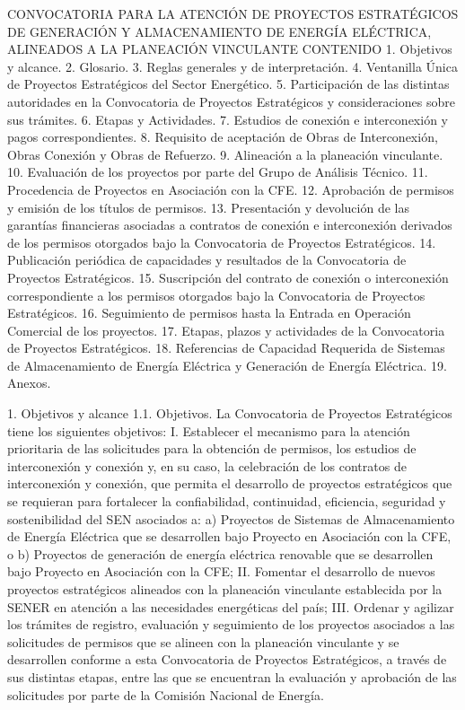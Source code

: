 CONVOCATORIA PARA LA ATENCIÓN DE PROYECTOS ESTRATÉGICOS DE GENERACIÓN Y ALMACENAMIENTO DE ENERGÍA ELÉCTRICA, ALINEADOS A LA PLANEACIÓN VINCULANTE
CONTENIDO
1. Objetivos y alcance.
2. Glosario.
3. Reglas generales y de interpretación.
4. Ventanilla Única de Proyectos Estratégicos del Sector Energético.
5. Participación de las distintas autoridades en la Convocatoria de Proyectos Estratégicos y consideraciones sobre sus trámites.
6. Etapas y Actividades.
7. Estudios de conexión e interconexión y pagos correspondientes.
8. Requisito de aceptación de Obras de Interconexión, Obras Conexión y Obras de Refuerzo.
9. Alineación a la planeación vinculante.
10. Evaluación de los proyectos por parte del Grupo de Análisis Técnico.
11. Procedencia de Proyectos en Asociación con la CFE.
12. Aprobación de permisos y emisión de los títulos de permisos.
13. Presentación y devolución de las garantías financieras asociadas a contratos de conexión e interconexión derivados de los permisos otorgados bajo la Convocatoria de Proyectos Estratégicos.
14. Publicación periódica de capacidades y resultados de la Convocatoria de Proyectos Estratégicos.
15. Suscripción del contrato de conexión o interconexión correspondiente a los permisos otorgados bajo la Convocatoria de Proyectos Estratégicos.
16. Seguimiento de permisos hasta la Entrada en Operación Comercial de los proyectos.
17. Etapas, plazos y actividades de la Convocatoria de Proyectos Estratégicos.
18. Referencias de Capacidad Requerida de Sistemas de Almacenamiento de Energía Eléctrica y Generación de Energía Eléctrica.
19. Anexos.\par
1. Objetivos y alcance
1.1. Objetivos. La Convocatoria de Proyectos Estratégicos tiene los siguientes objetivos:
I. Establecer el mecanismo para la atención prioritaria de las solicitudes para la obtención de permisos, los estudios de interconexión y conexión y, en su caso, la celebración de los contratos de interconexión y conexión, que permita el desarrollo de proyectos estratégicos que se requieran para fortalecer la confiabilidad, continuidad, eficiencia, seguridad y sostenibilidad del SEN asociados a:
a) Proyectos de Sistemas de Almacenamiento de Energía Eléctrica que se desarrollen bajo Proyecto en Asociación con la CFE, o
b) Proyectos de generación de energía eléctrica renovable que se desarrollen bajo Proyecto en Asociación con la CFE;
II. Fomentar el desarrollo de nuevos proyectos estratégicos alineados con la planeación vinculante establecida por la SENER en atención a las necesidades energéticas del país;
III. Ordenar y agilizar los trámites de registro, evaluación y seguimiento de los proyectos asociados a las solicitudes de permisos que se alineen con la planeación vinculante y se desarrollen conforme a esta Convocatoria de Proyectos Estratégicos, a través de sus distintas etapas, entre las que se encuentran la evaluación y aprobación de las solicitudes por parte de la Comisión Nacional de Energía.
